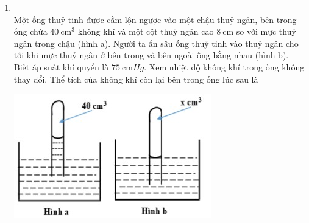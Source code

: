 \begin{enumerate}[label=\bfseries Câu \arabic*:, leftmargin=1.7cm]
\item {}\\
Một ống thuỷ tinh được cắm lộn ngược vào một chậu thuỷ ngân, bên trong ống chứa $\SI{40}{\centi\meter^3}$ không khí và một cột thuỷ ngân cao $\SI{8}{\centi\meter}$ so với mực thuỷ ngân trong chậu (hình a). Người ta ấn sâu ống thuỷ tinh vào thuỷ ngân cho tới khi mực thuỷ ngân ở bên trong và bên ngoài ống bằng nhau (hình b). Biết áp suất khí quyển là $\SI{75}{\centi\meter Hg}$. Xem nhiệt độ không khí trong ống không thay đổi. Thể tích của không khí còn lại bên trong ống lúc sau là
\begin{center}
	\includegraphics[width=0.35\linewidth]{../figs/VN12-Y24-PH-SYL-010P-7}
\end{center}


\end{enumerate}

